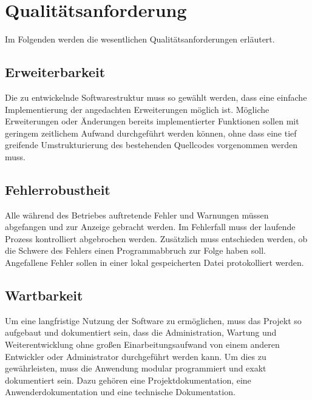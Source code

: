 \chapter*{Qualitätsanforderung}
Im Folgenden werden die wesentlichen Qualitätsanforderungen erläutert.

\section*{Erweiterbarkeit}
Die zu entwickelnde Softwarestruktur muss so gewählt werden, dass eine einfache Implementierung der angedachten Erweiterungen möglich ist. 
Mögliche Erweiterungen oder Änderungen bereits implementierter Funktionen sollen mit geringem zeitlichem Aufwand durchgeführt werden können, ohne dass eine tief greifende Umstrukturierung des bestehenden Quellcodes vorgenommen werden muss. 

\section*{Fehlerrobustheit}
Alle während des Betriebes auftretende Fehler und Warnungen müssen abgefangen und zur Anzeige gebracht werden. Im Fehlerfall muss der laufende Prozess kontrolliert abgebrochen werden. Zusätzlich muss entschieden werden, ob die Schwere des Fehlers einen Programmabbruch zur Folge haben soll. Angefallene Fehler sollen in einer lokal gespeicherten Datei protokolliert werden. 

\section*{Wartbarkeit}
Um eine langfristige Nutzung der Software zu ermöglichen, muss das Projekt so aufgebaut und dokumentiert sein, dass die Administration, Wartung und Weiterentwicklung ohne großen Einarbeitungsaufwand von einem anderen Entwickler oder Administrator durchgeführt werden kann. 
Um dies zu gewährleisten, muss die Anwendung modular programmiert und exakt dokumentiert sein. 
Dazu gehören eine Projektdokumentation, eine Anwenderdokumentation und eine technische Dokumentation. 